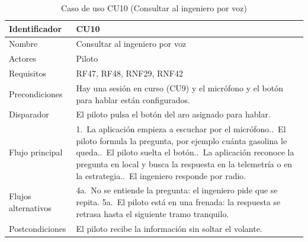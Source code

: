 \clearpage   %
\begin{table}[H]
	\centering
	\renewcommand{\arraystretch}{1.5}
	\begin{tabular}{|l|p{10cm}|}
		\hline
		Identificador & CU10 \\
		\hline
		Nombre & Consultar al ingeniero por voz \\
		\hline
		Actores & Piloto \\
		\hline
		Requisitos & RF47, RF48, RNF29, RNF42 \\
		\hline
		Precondiciones & Hay una sesión en curso (CU9) y el micrófono y el botón para hablar están configurados. \\
		\hline
		Disparador & El piloto pulsa el botón del aro asignado para hablar. \\
		\hline
		Flujo principal & 1.~La aplicación empieza a escuchar por el micrófono.\newline
		2.~El piloto formula la pregunta, por ejemplo cuánta gasolina le queda.\newline
		3.~El piloto suelta el botón.\newline
		4.~La aplicación reconoce la pregunta en local y busca la respuesta en la telemetría o en la estrategia.\newline
		5.~El ingeniero responde por radio. \\
		\hline
		Flujos alternativos & 4a.~No se entiende la pregunta: el ingeniero pide que se repita.\newline
		5a.~El piloto está en una frenada: la respuesta se retrasa hasta el siguiente tramo tranquilo. \\
		\hline
		Postcondiciones & El piloto recibe la información sin soltar el volante. \\
		\hline
	\end{tabular}
	\caption{Caso de uso CU10 (Consultar al ingeniero por voz)}
	\label{tab:cu10}
\end{table}

